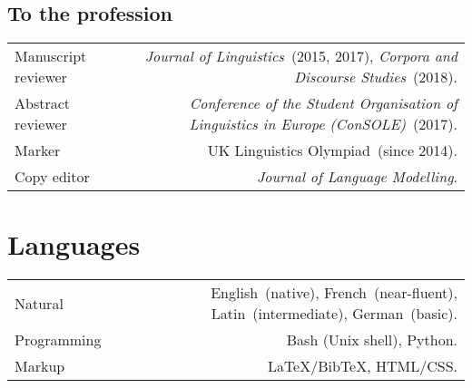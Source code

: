 \documentclass[11pt,a4paper,twoside]{article}
\makeatletter
\newenvironment{cvsection}{%
  \setlength{\extrarowheight}{0.70ex}
  \begin{longtable}[l]{@{} L R @{}}
}{%
  \end{longtable}
}
\newcommand{\Label}[1]{%
\textnormal{#1}%
}
\makeatother
\begin{document}
\subsection*{To the profession}

%
%

\begin{cvsection}
\Label{Manuscript reviewer} &	\textit{Journal of Linguistics}~(2015, 2017),
                      \textit{Corpora and Discourse Studies}~(2018).\\
\Label{Abstract reviewer}   & \textit{Conference of the Student Organisation of
                      Linguistics in Europe (ConSOLE)}~(2017).\\
\Label{Marker}              & UK Linguistics Olympiad~(since 2014).\\
\Label{Copy editor}         & \textit{Journal of Language Modelling}.
\end{cvsection}

\newpage
\section*{Languages}

\begin{cvsection}
  \Label{Natural}      & English~(native), French~(near-fluent),
                          Latin~(intermediate), German~(basic). \\
  \Label{Programming}  & Bash (Unix shell), Python. \\
  \Label{Markup}       & \LaTeX*\slash Bib\TeX*, HTML\slash CSS.
\end{cvsection}

\end{document}
